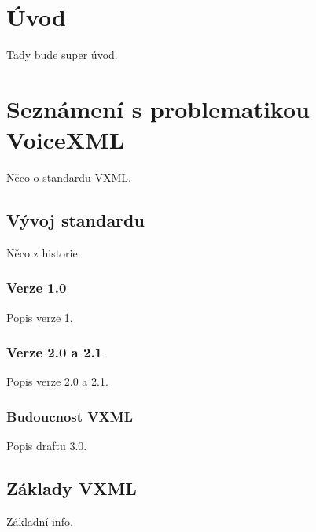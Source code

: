 \documentclass[ing,male,java,dept460]{diploma}						%
\begin{document}
\MakeTitlePages

\tableofcontents
\cleardoublepage	%

\listoftables
\cleardoublepage	%

\listoffigures
\cleardoublepage	%


\lstlistoflistings
\cleardoublepage	%



\section{Úvod}
\label{sec:Uvod}
Tady bude super úvod.

\section{Seznámení s problematikou VoiceXML}
\label{sec:Seznameni_s_vxml}
Něco o standardu VXML.

\subsection{Vývoj standardu}
Něco z historie.

\subsubsection{Verze 1.0}
Popis verze 1.

\subsubsection{Verze 2.0 a 2.1}
Popis verze 2.0 a 2.1.

\subsubsection{Budoucnost VXML}
Popis draftu 3.0.

\subsection{Základy VXML}
Základní info.
\end{document}
